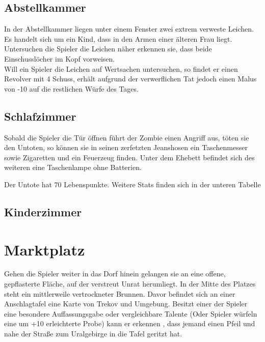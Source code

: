 \subsection{Abstellkammer}

In der Abstellkammer liegen unter einem Fenster zwei extrem verweste Leichen. Es handelt sich um ein Kind, dass in den Armen einer älteren Frau liegt. Untersuchen die Spieler die Leichen näher erkennen sie, dass beide Einschusslöcher im Kopf vorweisen.
\\Will ein Spieler die Leichen auf Wertsachen untersuchen, so findet er einen Revolver mit 4 Schuss, erhält aufgrund der verwerflichen Tat jedoch einen Malus von -10 auf die restlichen Würfe des Tages.

\subsection{Schlafzimmer}

Sobald die Spieler die Tür öffnen führt der Zombie einen Angriff aus, töten sie den Untoten, so können sie in seinen zerfetzten Jeanshosen ein Taschenmesser sowie Zigaretten und ein Feuerzeug finden.
Unter dem Ehebett befindet sich des weiteren eine Taschenlampe ohne Batterien.

Der Untote hat 70 Lebenspunkte. Weitere Stats finden sich in der unteren Tabelle

\begin{center}
  
\end{center}

\subsection{Kinderzimmer}




\section{Marktplatz}

Gehen die Spieler weiter in das Dorf hinein gelangen sie an eine offene, gepflasterte Fläche, auf der verstreut Unrat herumliegt.
In der Mitte des Platzes steht ein mittlerweile vertrockneter Brunnen. Davor befindet sich an einer Anschlagtafel eine Karte von Trekov und Umgebung.
Besitzt einer der Spieler eine besondere Auffassungsgabe oder vergleichbare Talente (Oder Spieler würfeln eine um +10 erleichterte Probe) kann er erkennen , dass jemand einen Pfeil und  nahe der Straße zum Uralgebirge in die Tafel geritzt hat.

